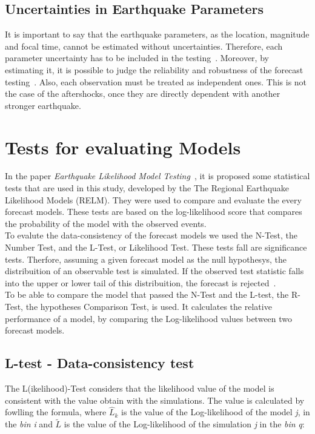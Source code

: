 \subsection{Uncertainties in Earthquake Parameters}
It is important to say that the earthquake parameters, as the location, magnitude and focal time, cannot be estimated without uncertainties. Therefore, each parameter uncertainty has to be included in the testing~\cite{schorlemmer2007earthquake}. Moreover, by estimating it, it is possible to judge the reliability and robustness of the forecast testing~\cite{eberhard2014multiscale}. Also, each observation must be treated as independent ones. This is not the case of the aftershocks, once they are directly dependent with another stronger earthquake. \\

\section{Tests for evaluating Models}\label{Tests}
In the paper {\it Earthquake Likelihood Model Testing}~\cite{schorlemmer2007earthquake}, it is proposed some statistical tests that are used in this study, developed by the The
Regional Earthquake Likelihood Models (RELM). They were used to compare
and evaluate the every forecast models. These tests are based on the
log-likelihood score that compares the probability of the model with
the observed events.\\

To evalute the data-consistency of the forecast models we used the
N-Test, the Number Test, and the L-Test, or Likelihood Test. These
tests fall are significance tests. Therfore, assuming a given forecast
model as the null hypothesys, the distribuition of an observable test
is simulated. If the observed test statistic falls into the upper or
lower tail of this distribuition, the forecast is
rejected~\cite{schorlemmer2010first}.\\

To be able to compare the model that passed the N-Test and the L-test,
the R-Test, the hypotheses Comparison Test, is used. It calculates the
relative performance of a model, by comparing the Log-likelihood
values between two forecast models.\\
\subsection{L-test - Data-consistency test}
The L(ikelihood)-Test considers that the likelihood value of the model
is consistent with the value obtain with the simulations. The value is
calculated by fowlling the formula, where $\widehat{L}_k$ is the value of the
Log-likelihood of the model {\it j}, in the {\it bin} {\it i} and
$\widetilde{L}$ is the value of the Log-likelihood of the simulation
{\it j} in the {\it bin} {\it q}:


